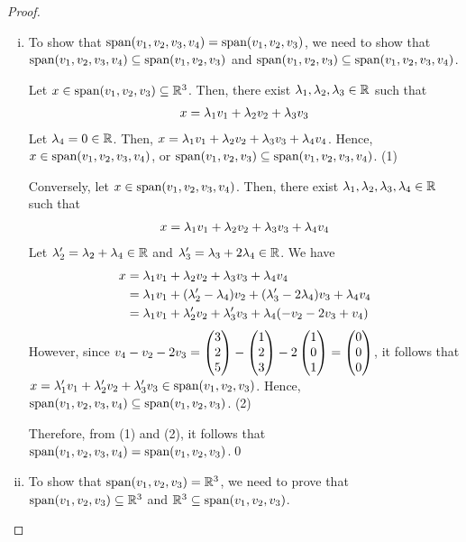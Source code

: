 \renewcommand{\qedsymbol}{$ $}
\begin{proof}
    \begin{enumerate}[(i)]
        \renewcommand{\qedsymbol}{$\blacksquare$}
        \item To show that $\textnormal{span}(v_1,v_2,v_3,v_4)=\textnormal{span}(v_1,v_2,v_3)$, we need to show that\\ $\textnormal{span}(v_1,v_2,v_3,v_4)\subseteq\textnormal{span}(v_1,v_2,v_3)$ and $\textnormal{span}(v_1,v_2,v_3)\subseteq\textnormal{span}(v_1,v_2,v_3,v_4)$.
        
        Let $x\in\textnormal{span}(v_1,v_2,v_3)\subseteq\mathbb R^3$. Then, there exist $\lambda_1,\lambda_2,\lambda_3\in\mathbb R$ such that
        \[
            \begin{aligned}
                x=\lambda_1v_1+\lambda_2v_2+\lambda_3v_3
            \end{aligned}    
        \]
        Let $\lambda_4=0\in\mathbb R$. Then, $x=\lambda_1v_1+\lambda_2v_2+\lambda_3v_3+\lambda_4v_4$. Hence, $x\in\textnormal{span}(v_1,v_2,v_3,v_4)$, or $\textnormal{span}(v_1,v_2,v_3)\subseteq\textnormal{span}(v_1,v_2,v_3,v_4)$. (1)
        
        Conversely, let $x\in\textnormal{span}(v_1,v_2,v_3,v_4)$. Then, there exist $\lambda_1,\lambda_2,\lambda_3,\lambda_4\in\mathbb R$ such that
        \[
            \begin{aligned}
                x=\lambda_1v_1+\lambda_2v_2+\lambda_3v_3+\lambda_4v_4
            \end{aligned}
        \]  
        Let $\lambda_2'=\lambda_2+\lambda_4\in\mathbb R$ and $\lambda_3'=\lambda_3+2\lambda_4\in\mathbb R$. We have
        \[
            \begin{aligned}
                x &= \lambda_1v_1+\lambda_2v_2+\lambda_3v_3+\lambda_4v_4\\
                  &= \lambda_1v_1+(\lambda_2'-\lambda_4)v_2+(\lambda_3'-2\lambda_4)v_3+\lambda_4v_4\\
                  &= \lambda_1v_1+\lambda_2'v_2+\lambda_3'v_3+\lambda_4(-v_2-2v_3+v_4)
            \end{aligned}  
        \]
        However, since $v_4-v_2-2v_3=\begin{pmatrix} 3\\ 2\\ 5\end{pmatrix}-\begin{pmatrix} 1\\ 2\\ 3\end{pmatrix}-2\begin{pmatrix} 1\\ 0\\ 1\end{pmatrix}=\begin{pmatrix} 0\\ 0\\ 0\end{pmatrix}$, it follows that $x=\lambda_1'v_1+\lambda_2'v_2+\lambda_3'v_3\in\textnormal{span}(v_1,v_2,v_3)$. Hence, $\textnormal{span}(v_1,v_2,v_3,v_4)\subseteq\textnormal{span}(v_1,v_2,v_3)$. (2)

        Therefore, from (1) and (2), it follows that $\textnormal{span}(v_1,v_2,v_3,v_4)=\textnormal{span}(v_1,v_2,v_3)$.\qed
        \item To show that $\textnormal{span}(v_1,v_2,v_3)=\mathbb R^3$, we need to prove that $\textnormal{span}(v_1,v_2,v_3)\subseteq\mathbb R^3$ and $\mathbb R^3\subseteq\textnormal{span}(v_1,v_2,v_3)$.


\end{enumerate}
\end{proof}
